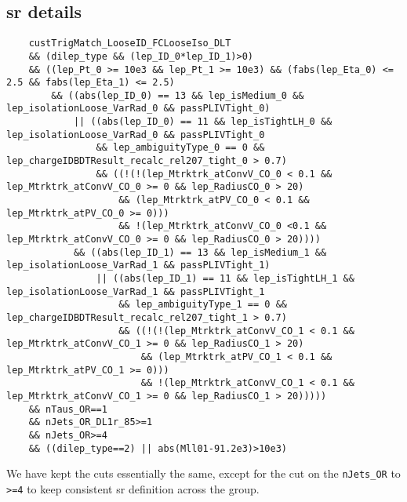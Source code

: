 \subsection{\gls{sr} details}

{\scriptsize
    \begin{verbatim}
    custTrigMatch_LooseID_FCLooseIso_DLT
    && (dilep_type && (lep_ID_0*lep_ID_1)>0)
    && ((lep_Pt_0 >= 10e3 && lep_Pt_1 >= 10e3) && (fabs(lep_Eta_0) <= 2.5 && fabs(lep_Eta_1) <= 2.5)
        && ((abs(lep_ID_0) == 13 && lep_isMedium_0 && lep_isolationLoose_VarRad_0 && passPLIVTight_0)
            || ((abs(lep_ID_0) == 11 && lep_isTightLH_0 && lep_isolationLoose_VarRad_0 && passPLIVTight_0
                && lep_ambiguityType_0 == 0 && lep_chargeIDBDTResult_recalc_rel207_tight_0 > 0.7)
                && ((!(!(lep_Mtrktrk_atConvV_CO_0 < 0.1 && lep_Mtrktrk_atConvV_CO_0 >= 0 && lep_RadiusCO_0 > 20)
                    && (lep_Mtrktrk_atPV_CO_0 < 0.1 && lep_Mtrktrk_atPV_CO_0 >= 0)))
                    && !(lep_Mtrktrk_atConvV_CO_0 <0.1 && lep_Mtrktrk_atConvV_CO_0 >= 0 && lep_RadiusCO_0 > 20))))
            && ((abs(lep_ID_1) == 13 && lep_isMedium_1 && lep_isolationLoose_VarRad_1 && passPLIVTight_1)
                || ((abs(lep_ID_1) == 11 && lep_isTightLH_1 && lep_isolationLoose_VarRad_1 && passPLIVTight_1
                    && lep_ambiguityType_1 == 0 && lep_chargeIDBDTResult_recalc_rel207_tight_1 > 0.7)
                    && ((!(!(lep_Mtrktrk_atConvV_CO_1 < 0.1 && lep_Mtrktrk_atConvV_CO_1 >= 0 && lep_RadiusCO_1 > 20)
                        && (lep_Mtrktrk_atPV_CO_1 < 0.1 && lep_Mtrktrk_atPV_CO_1 >= 0)))
                        && !(lep_Mtrktrk_atConvV_CO_1 < 0.1 && lep_Mtrktrk_atConvV_CO_1 >= 0 && lep_RadiusCO_1 > 20)))))
    && nTaus_OR==1
    && nJets_OR_DL1r_85>=1
    && nJets_OR>=4
    && ((dilep_type==2) || abs(Mll01-91.2e3)>10e3)
\end{verbatim}
}

We have kept the cuts essentially the same, except for the cut on the \verb|nJets_OR| to \verb|>=4| to keep consistent
\gls{sr} definition across the group.
